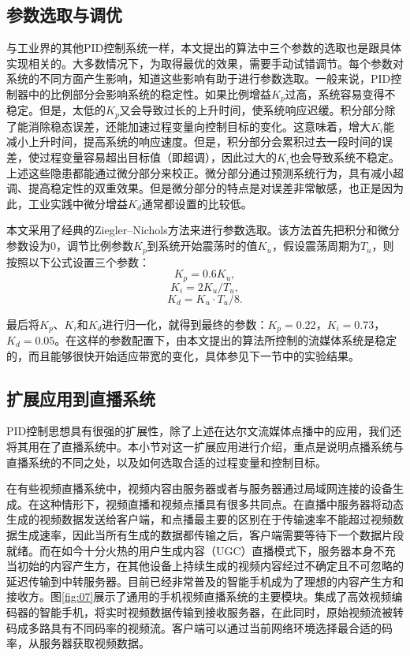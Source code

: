 \subsection{参数选取与调优}

与工业界的其他PID控制系统一样，本文提出的算法中三个参数的选取也是跟具体实现相关的。大多数情况下，为取得最优的效果，需要手动试错调节。每个参数对系统的不同方面产生影响，知道这些影响有助于进行参数选取。一般来说，PID控制器中的比例部分会影响系统的稳定性。如果比例增益$K_p$过高，系统容易变得不稳定。但是，太低的$K_p$又会导致过长的上升时间，使系统响应迟缓。积分部分除了能消除稳态误差，还能加速过程变量向控制目标的变化。这意味着，增大$K_i$能减小上升时间，提高系统的响应速度。但是，积分部分会累积过去一段时间的误差，使过程变量容易超出目标值（即超调），因此过大的$K_i$也会导致系统不稳定。上述这些隐患都能通过微分部分来校正。微分部分通过预测系统行为，具有减小超调、提高稳定性的双重效果。但是微分部分的特点是对误差非常敏感，也正是因为此，工业实践中微分增益$K_d$通常都设置的比较低。

本文采用了经典的Ziegler--Nichols方法\supercite{Ziegler1942}来进行参数选取。该方法首先把积分和微分参数设为0，调节比例参数$K_p$到系统开始震荡时的值$K_u$，假设震荡周期为$T_u$，则按照以下公式设置三个参数：
\begin{equation}
K_p = 0.6K_u,
\end{equation}
\begin{equation}
K_i = 2K_u/T_u,
\end{equation}
\begin{equation}
K_d = K_u \cdot T_u/8.
\end{equation}

最后将$K_p$、$K_i$和$K_d$进行归一化，就得到最终的参数：$K_p = 0.22$，$K_i = 0.73$，$K_d = 0.05$。在这样的参数配置下，由本文提出的算法所控制的流媒体系统是稳定的，而且能够很快开始适应带宽的变化，具体参见下一节中的实验结果。

\subsection{扩展应用到直播系统}

PID控制思想具有很强的扩展性，除了上述在达尔文流媒体点播中的应用，我们还将其用在了直播系统中。本小节对这一扩展应用进行介绍，重点是说明点播系统与直播系统的不同之处，以及如何选取合适的过程变量和控制目标。

在有些视频直播系统中，视频内容由服务器或者与服务器通过局域网连接的设备生成。在这种情形下，视频直播和视频点播具有很多共同点。在直播中服务器将动态生成的视频数据发送给客户端，和点播最主要的区别在于传输速率不能超过视频数据生成速率，因此当所有生成的数据都传输之后，客户端需要等待下一个数据片段就绪\supercite{Thang2014}。而在如今十分火热的用户生成内容（UGC）直播模式下，服务器本身不充当初始的内容产生方，在其他设备上持续生成的视频内容经过不确定且不可忽略的延迟传输到中转服务器。目前已经非常普及的智能手机成为了理想的内容产生方和接收方。图\ref{fig:07}展示了通用的手机视频直播系统的主要模块。集成了高效视频编码器的智能手机，将实时视频数据传输到接收服务器，在此同时，原始视频流被转码成多路具有不同码率的视频流。客户端可以通过当前网络环境选择最合适的码率，从服务器获取视频数据。

